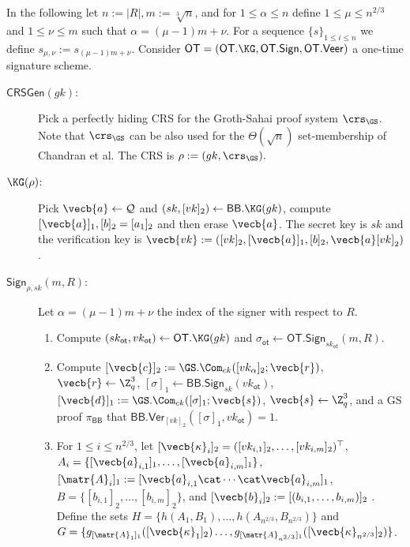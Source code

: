 In the following let $n:=|R|, m:=\sqrt[3]{n}$, and for $1\leq \alpha\leq n$ define $1\leq \mu \leq n^{2/3}$ and $1\leq \nu\leq m$ such that $\alpha=(\mu-1)m+\nu$. For a sequence $\{s\}_{1\leq i\leq n}$ we define $s_{\mu,\nu}:=s_{(\mu-1)m+\nu}$. Consider $\mathsf{OT}=(\mathsf{OT}.\KG,\mathsf{OT}.\mathsf{Sign},\allowbreak\mathsf{OT}.\mathsf{Veer})$ a one-time signature scheme.

\begin{description}
\item[$\mathsf{CRSGen}(gk)$:] Pick a perfectly hiding CRS for the Groth-Sahai proof system $\crs_\GS$. Note that $\crs_\GS$ can be also used for the $\Theta(\sqrt{n})$ set-membership of Chandran et al. The CRS is $\rho:=(gk,\crs_\GS).$

\item[$\KG(\rho)$:] Pick $\vecb{a}\gets\mathcal{Q}$ and $(sk,[vk]_2)\gets\mathsf{BB}.\KG(gk)$, compute $[\vecb{a}]_1,[b]_2=[a_1]_2$ and then erase $\vecb{a}$. The secret key is $sk$ and the verification key is $\vecb{vk}:=([vk]_2,[\vecb{a}]_1,[b]_2,\vecb{a}[vk]_2)$.

\item[$\mathsf{Sign}_{\rho,sk}(m,R)$:] Let $\alpha=(\mu-1)m+\nu$ the index of the signer with respect to $R$.
\begin{enumerate}
\item Compute $(sk_\mathsf{ot},vk_\mathsf{ot})\gets\mathsf{OT}.\KG(gk)$ and $\sigma_\mathsf{ot}\gets\allowbreak\mathsf{OT}.\allowbreak\mathsf{Sign}_{sk_\mathsf{ot}}(m,R)$.

\item Compute $[\vecb{c}]_2:=\GS.\Com_{ck}([vk_\alpha]_2;\vecb{r})$, $\vecb{r}\gets\Z_q^3$, $[\sigma]_1\gets\mathsf{BB}.\mathsf{Sign}_{sk}(vk_\mathsf{ot})$, $[\vecb{d}]_1:=\GS.\Com_{ck}([\sigma]_1;\vecb{s})$, $\vecb{s}\gets\Z_q^3$, and a GS proof $\pi_\mathsf{BB}$ that $\mathsf{BB}.\mathsf{Ver}_{[vk]_2}(\allowbreak[\sigma]_1,vk_\mathsf{ot})=1$.

\item For $1\leq i \leq n^{2/3}$, let $[\vecb{\kappa}_i]_2=([vk_{i,1}]_2,\ldots,[vk_{i,m}]_2)^\top$, $A_i=\{[\vecb{a}_{i,1}]_1,\allowbreak\ldots,\allowbreak[\vecb{a}_{i,m}]_1\}$,  $[\matr{A}_i]_1:=[\vecb{a}_{i,1}\cat\cdots\cat\vecb{a}_{i,m}]_1$, $B=\{[b_{i,1}]_2,\ldots,[b_{i,m}]_2\}$, and $[\vecb{b}_i]_2:=[(b_{i,1},\ldots,b_{i,m})]_2$ . Define the sets
$H=\{h(A_1,B_1),\allowbreak\ldots,\allowbreak h(A_{n^{2/3}},B_{n^{2/3}})\}$ and
$G=\{
	g_{[\matr{A}_1]_1}([\vecb{\kappa}_1]_2)
	\allowbreak\ldots,\allowbreak
	g_{[\matr{A}_{n^{2/3}}]_1}([\vecb{\kappa}_{n^{2/3}}]_2)\}$.


\end{enumerate}
\end{description}
